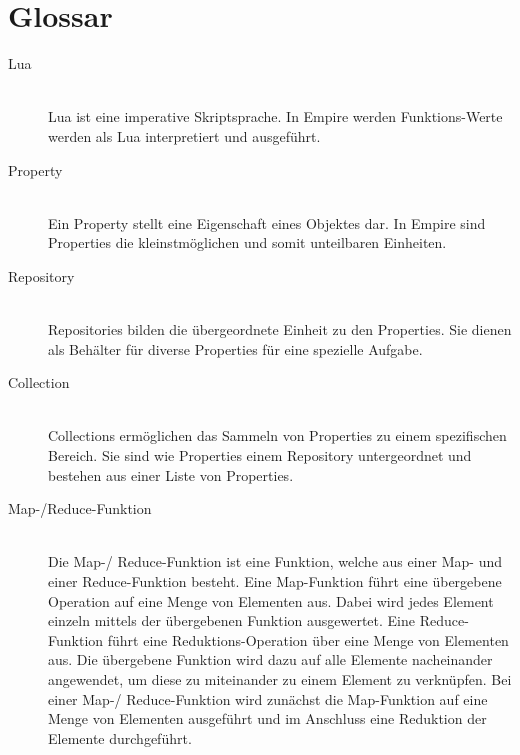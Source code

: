 
\section{Glossar}

\begin{description}
  \item[Lua] \hfill \\
  Lua ist eine imperative Skriptsprache. In Empire werden Funktions-Werte werden als Lua interpretiert und ausgeführt.
  \item[Property] \hfill \\
  Ein Property stellt eine Eigenschaft eines Objektes dar. In Empire sind Properties die kleinstmöglichen und somit unteilbaren Einheiten.
  \item[Repository] \hfill \\
  Repositories bilden die übergeordnete Einheit zu den Properties. Sie dienen als Behälter für diverse Properties für eine spezielle Aufgabe.
  \item[Collection] \hfill \\
  Collections ermöglichen das Sammeln von Properties zu einem spezifischen Bereich. Sie sind wie Properties einem Repository untergeordnet und bestehen aus einer Liste von Properties.
  \item[Map-/Reduce-Funktion] \hfill \\
  Die Map-/ Reduce-Funktion ist eine Funktion, welche aus einer Map- und einer Reduce-Funktion besteht. Eine Map-Funktion führt eine übergebene Operation auf eine Menge von Elementen aus. Dabei wird jedes Element einzeln mittels der übergebenen Funktion ausgewertet. Eine Reduce-Funktion führt eine Reduktions-Operation über eine Menge von Elementen aus. Die übergebene Funktion wird dazu auf alle Elemente nacheinander angewendet, um diese zu miteinander zu einem Element zu verknüpfen. Bei einer Map-/ Reduce-Funktion wird zunächst die Map-Funktion auf eine Menge von Elementen ausgeführt und im Anschluss eine Reduktion der Elemente durchgeführt.
\end{description}
